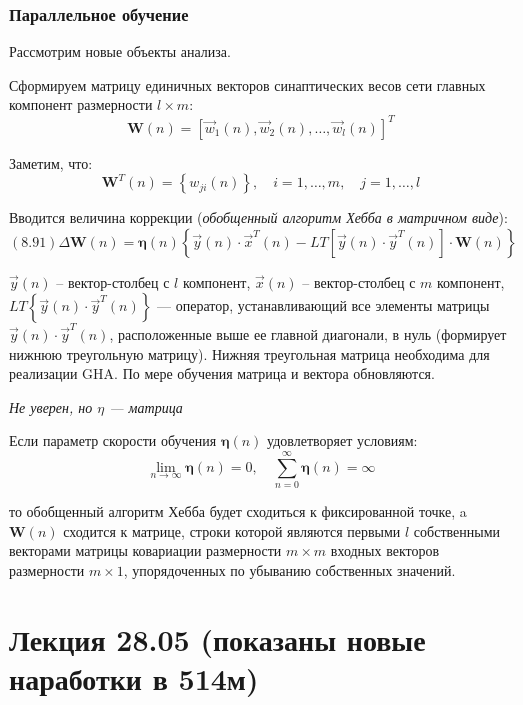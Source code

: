 \documentclass{article}
\numberwithin{equation}{subsection}
\begin{document}
\subsubsection{Параллельное обучение}

Рассмотрим новые объекты анализа.

Сформируем матрицу единичных векторов синаптических весов сети главных компонент
размерности $l \times m$:
\begin{equation}
    \mathbf{W}(n) = 
    \left[
        \vec{w}_1(n), \vec{w}_2(n) , \dots, \vec{w}_l(n)
    \right]^T
\end{equation}

Заметим, что:
\begin{equation*}
    \mathbf{W}^T(n) = 
    \left\{
        w_{ji}(n)
    \right\}, \quad i = 1, \dots, m,\quad j=1, \dots, l
\end{equation*}

Вводится величина коррекции (\textit{обобщенный алгоритм Хебба в матричном виде}):
\begin{equation}
    (8.91)
    \Delta \mathbf{W}(n) = \mathbf{\eta}(n) 
    \left\{
        \vec{y}(n) \cdot \vec{x}^T(n) - LT
        \left[
            \vec{y}(n) \cdot \vec{y}^T(n)
        \right]
        \cdot \mathbf{W}(n)        
    \right\}
\end{equation}

\noindent
$\vec{y}(n)$ -- вектор-столбец с $l$ компонент, $\vec{x}(n)$ -- вектор-столбец с $m$ компонент,
$LT\left\{ \vec{y}(n) \cdot \vec{y}^T(n) \right\}$ --- оператор, устанавливающий все элементы 
матрицы $\vec{y}(n) \cdot \vec{y}^T(n)$, расположенные выше ее главной диагонали, в нуль
(формирует нижнюю треугольную матрицу).
Нижняя треугольная матрица необходима для реализации GHA. По мере обучения матрица и вектора 
обновляются.

\begin{myquote}
    \textit{Не уверен, но $\eta$ --- матрица}
\end{myquote}

Если параметр скорости обучения $\mathbf{\eta}(n)$ удовлетворяет условиям:
\begin{equation*}
    \lim_{n \to \infty} \mathbf{\eta}(n) = 0, \quad
    \sum_{n=0}^{\infty} \mathbf{\eta}(n) = \infty
\end{equation*}

\noindent
то обобщенный алгоритм Хебба будет сходиться к фиксированной точке, a $\mathbf{W}(n)$ сходится 
к матрице, строки которой являются первыми $l$ собственными векторами матрицы ковариации
размерности $m \times m$ входных векторов размерности $m \times 1$, упорядоченных по убыванию 
собственных значений.




\section{Лекция 28.05 (показаны новые наработки в 514м)}
\end{document}
